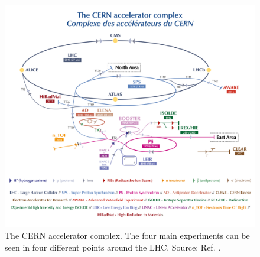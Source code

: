 \begin{figure}[!ht]
    \vspace*{-0.0cm}
    \centering
    \setlength{\mylength}{\textwidth}
    \includegraphics[width=0.84\mylength]{resources/LHC.png}
    \vspace*{-0.0cm}
    \caption{The CERN accelerator complex. The four main experiments can be seen in four different points around the LHC. Source: Ref. \cite{Mobs:2684277}.}
    \label{fig:CERN_LHC}
    \vspace*{-0.3cm}
\end{figure}

